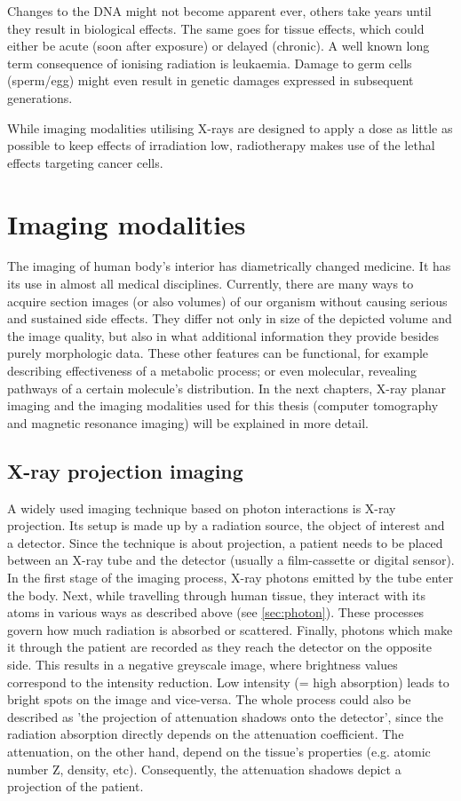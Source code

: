 Changes to the DNA might not become apparent ever, others take years until they result in biological effects.
The same goes for tissue effects, which could either be acute (soon after exposure) or delayed (chronic).
A well known long term consequence of ionising radiation is leukaemia.
Damage to germ cells (sperm/egg) might even result in genetic damages expressed in subsequent generations.


While imaging modalities utilising X-rays are designed to apply a dose as little as possible to keep effects of irradiation low, radiotherapy makes use of the lethal effects targeting cancer cells. \cite{Podgorsak, Maidment2014}

\section{Imaging modalities}

The imaging of human body's interior has diametrically changed medicine.
It has its use in almost all medical disciplines.
Currently, there are many ways to acquire section images (or also volumes) of our organism without causing serious and sustained side effects.
They differ not only in size of the depicted volume and the image quality, but also in what additional information they provide besides purely morphologic data.
These other features can be functional, for example describing effectiveness of a metabolic process; or even molecular, revealing pathways of a certain molecule's distribution.
In the next chapters, X-ray planar imaging and the imaging modalities used for this thesis (computer tomography and magnetic resonance imaging) will be explained in more detail.


\subsection{X-ray projection imaging}
A widely used imaging technique based on photon interactions is X-ray projection.
Its setup is made up by a radiation source, the object of interest and a detector.
Since the technique is about projection, a patient needs to be placed between an X-ray tube and the detector (usually a film-cassette or digital sensor).
In the first stage of the imaging process, X-ray photons emitted by the tube enter the body.
Next, while travelling through human tissue, they interact with its atoms in various ways as described above (see \ref{sec:photon}).
These processes govern how much radiation is absorbed or scattered.
Finally, photons which make it through the patient are recorded as they reach the detector on the opposite side.
This results in a negative greyscale image, where brightness values correspond to the intensity reduction.
Low intensity (= high absorption) leads to bright spots on the image and vice-versa.
The whole process could also be described as 'the projection of attenuation shadows onto the detector', since the radiation absorption directly depends on the attenuation coefficient. The attenuation, on the other hand, depend on the tissue's properties (e.g. atomic number Z, density, etc).
Consequently, the attenuation shadows depict a projection of the patient.

